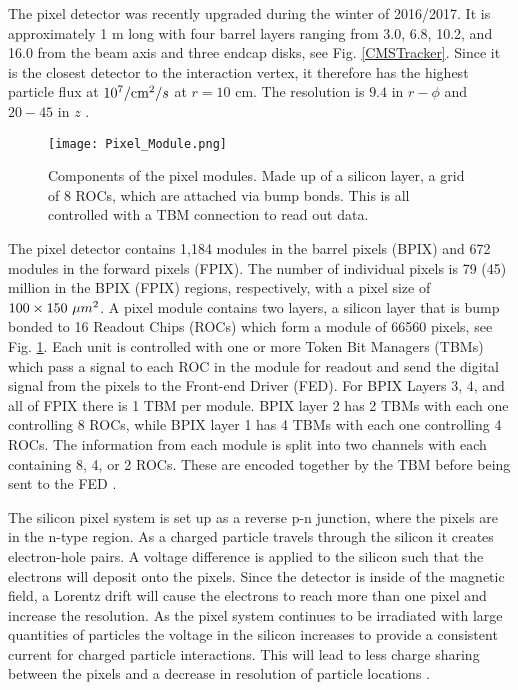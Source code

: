 The pixel detector was recently upgraded during the winter of 2016/2017. It is approximately 1 m long with four barrel layers ranging from 3.0, 6.8, 10.2, and 16.0 \cm{} from the beam axis and three endcap disks, see Fig. \ref{CMSTracker}. Since it is the closest detector to the interaction vertex, it therefore has the highest particle flux at $10^7/\text{cm}^2/s$ at $r=10$ cm. The resolution is $9.4$ \mum{} in $r-\phi$ and $20-45$ \mum{} in $z$ \cite{noauthor_cms_2012}.

\begin{figure}
 	\centering
	\texttt{[image: Pixel\_Module.png]}
 	\caption[Pixel Modules]{Components of the pixel modules. Made up of a silicon layer, a grid of 8 ROCs, which are attached via bump bonds. This is all controlled with a TBM connection to read out data.}
 	\label{PixelModule} 
\end{figure}

The pixel detector contains 1,184 modules in the barrel pixels (BPIX) and 672 modules in the forward pixels (FPIX). The number of individual pixels is 79 (45) million in the BPIX (FPIX) regions, respectively, with a pixel size of $100\times150 \text{ }\text{}\mu m^2$. A pixel module contains two layers, a silicon layer that is bump bonded to 16 Readout Chips (ROCs) which form a module of 66560 pixels, see Fig. \ref{PixelModule}. Each unit is controlled with one or more Token Bit Managers (TBMs) which pass a signal to each ROC in the module for readout and send the digital signal from the pixels to the Front-end Driver (FED). For BPIX Layers 3, 4, and all of FPIX there is 1 TBM per module. BPIX layer 2 has 2 TBMs with each one controlling 8 ROCs, while BPIX layer 1 has 4 TBMs with each one controlling 4 ROCs. The information from each module is split into two channels with each containing 8, 4, or 2 ROCs. These are encoded together by the TBM before being sent to the FED \cite{noauthor_cms_2012}.

The silicon pixel system is set up as a reverse p-n junction, where the pixels are in the n-type region. As a charged particle travels through the silicon it creates electron-hole pairs. A voltage difference is applied to the silicon such that the electrons will deposit onto the pixels. Since the detector is inside of the magnetic field, a Lorentz drift will cause the electrons to reach more than one pixel and increase the resolution. As the pixel system continues to be irradiated with large quantities of particles the voltage in the silicon increases to provide a consistent current for charged particle interactions. This will lead to less charge sharing between the pixels and a decrease in resolution of particle locations \cite{noauthor_cms_2012}. 

